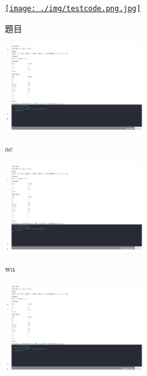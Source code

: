 \documentclass[12pt]{article}
\begin{document}
\begin{enumerate}
    \begin{figure}[htb]
      \centering
      \begin{subfigure}{0.45\linewidth}
        \centering
        \href{https://raw.githubusercontent.com/programingtw/proglearn-plan/main/img/testcode.png.jpg}{
          \texttt{[image: ./img/testcode.png.jpg]}
        }
        \caption{題目}
        \label{arc10}            
      \end{subfigure}
      \begin{subfigure}{0.45\linewidth}
        \centering
        \href{https://raw.githubusercontent.com/programingtw/proglearn-plan/main/img/hw_ac.png}{
          \includegraphics[width=0.65\textwidth]{./img/hw_ac.png}
        }
        \caption{ac}
        \label{arc11}
      \end{subfigure}
      \bigskip
      \begin{subfigure}{0.45\linewidth}
        \centering
        \href{https://raw.githubusercontent.com/programingtw/proglearn-plan/main/img/hw_wa.png}{
          \includegraphics[width=0.65\textwidth]{./img/hw_wa.png}
        }
        \caption{wa}
        \label{arc12}
      \end{subfigure}
      \begin{subfigure}{0.45\linewidth}
        \centering
        \href{https://raw.githubusercontent.com/programingtw/proglearn-plan/main/img/hw_re.png}{
          \includegraphics[width=0.65\textwidth]{./img/hw_re.png}
}
\end{subfigure}
\end{figure}
\end{enumerate}
\end{document}
